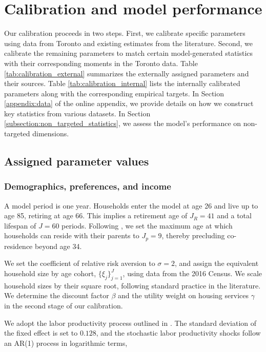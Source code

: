 \documentclass[parskip=full]{article}
\begin{document}
\section{Calibration and model performance}\label{sec:calibration}

Our calibration proceeds in two steps. First, we calibrate specific parameters using data from Toronto and existing estimates from the literature. Second, we calibrate the remaining parameters to match certain model-generated statistics with their corresponding moments in the Toronto data. Table \ref{tab:calibration_external} summarizes the externally assigned parameters and their sources. Table \ref{tab:calibration_internal} lists the internally calibrated parameters along with the corresponding empirical targets. In Section \ref{appendix:data} of the online appendix, we provide details on how we construct key statistics from various datasets. In Section \ref{subsection:non_targeted_statistics}, we assess the model's performance on non-targeted dimensions.

\subsection{Assigned parameter values}

\subsubsection{Demographics, preferences, and income}
A model period is one year. Households enter the model at age 26 and live up to age 85, retiring at age 66. This implies a retirement age of $J_{R}=41$ and a total lifespan of $J=60$ periods. Following \citet{rs-2023}, we set the maximum age at which households can reside with their parents to $J_{p}=9$, thereby precluding co-residence beyond age 34. 

We set the coefficient of relative risk aversion to $\sigma=2$, and assign the equivalent household size by age cohort, $\{\xi_{j}\}_{j=1}^{J}$, using data from the 2016 Census. We scale household sizes by their square root, following standard practice in the literature. We determine the discount factor $\beta$ and the utility weight on housing services $\gamma$ in the second stage of our calibration.

We adopt the labor productivity process outlined in \citet{gkkoc}. The standard deviation of the fixed effect is set to $0.128$, and the stochastic labor productivity shocks follow an AR(1) process in logarithmic terms,
\end{document}
